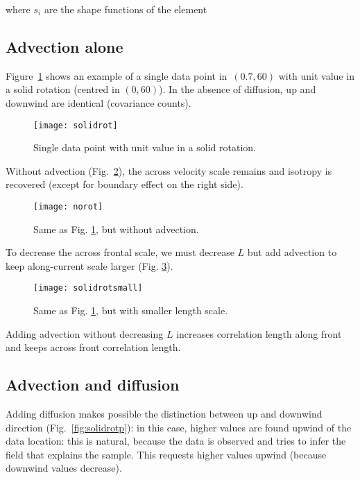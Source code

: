 where $s_i$ are the shape functions of the element



\subsection{Advection alone}

Figure~\ref{fig:solidrot} shows an example of a single data point in\, $(0.7,60)$ with unit value in a solid 
rotation (centred in $(0,60)$). In the absence of diffusion, up and downwind are identical (covariance 
counts).

\begin{figure}[H]
\parbox{.6\textwidth}{
\texttt{[image: solidrot]}
}\parbox{.4\textwidth}{
\caption{Single data point with unit value in a solid 
rotation.\label{fig:solidrot}}
}
\end{figure}


Without advection (Fig.~\ref{fig:norot}), the across velocity scale remains and isotropy is 
recovered (except for boundary effect on the right side).

\begin{figure}[H]
\parbox{.6\textwidth}{
\texttt{[image: norot]}
}\parbox{.4\textwidth}{
\caption{Same as Fig. \ref{fig:solidrot}, but without advection. \label{fig:norot}}
}
\end{figure}



To decrease the across frontal scale, we must decrease $L$ but add advection 
to keep along-current scale larger (Fig. \ref{fig:solidrotsmall}).

\begin{figure}[H]
\parbox{.6\textwidth}{
\texttt{[image: solidrotsmall]}
}\parbox{.4\textwidth}{
\caption{Same as Fig. \ref{fig:solidrot}, but with smaller length scale. \label{fig:solidrotsmall}}
}
\end{figure}


Adding advection without decreasing $L$ increases correlation length 
along front and keeps across front correlation length.

\subsection{Advection and diffusion}

Adding diffusion  makes possible the distinction between up and downwind 
direction (Fig.~\ref{fig:solidrotp}): in this case, higher values are found upwind of the data 
location: this is natural, because the data is observed and \diva tries to 
infer the field that explains the sample. This requests higher values 
upwind (because downwind values decrease).


